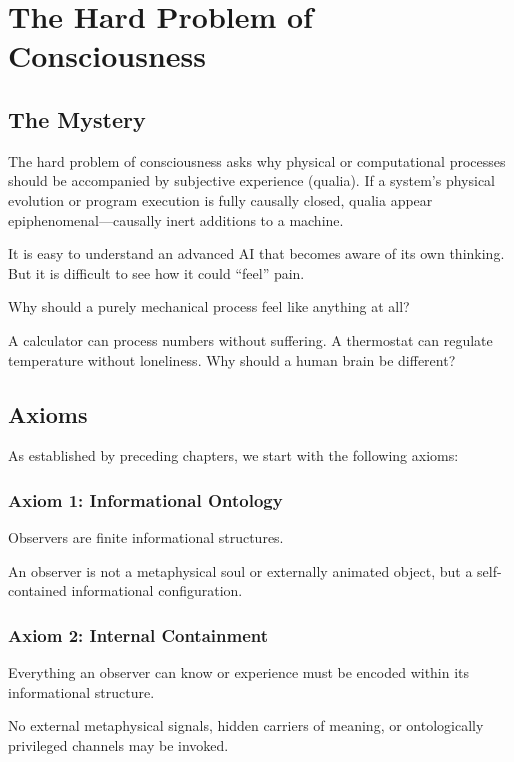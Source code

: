 \chapter{The Hard Problem of Consciousness}
\label{the-hard-problem}

\section{The Mystery}

The hard problem of consciousness \cite{chalmers1995facing} asks why physical or computational processes should be accompanied by subjective experience (qualia).
If a system's physical evolution or program execution is fully causally closed, qualia appear epiphenomenal—causally inert additions to a machine.

It is easy to understand an advanced AI that becomes aware of its own thinking. But it is difficult to see how it could ``feel'' pain. 

Why should a purely mechanical process feel like anything at all?

A calculator can process numbers without suffering. A thermostat can regulate temperature without loneliness. Why should a human brain be different?


\section{Axioms}

As established by preceding chapters, we start with the following axioms:

\subsection*{Axiom 1: Informational Ontology}

Observers are finite informational structures.

An observer is not a metaphysical soul or externally animated object, but a self-contained informational configuration.


\subsection*{Axiom 2: Internal Containment}

Everything an observer can know or experience must be encoded within its informational structure.

No external metaphysical signals, hidden carriers of meaning, or ontologically privileged channels may be invoked.



